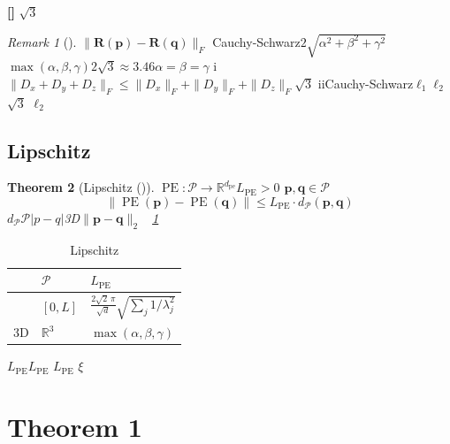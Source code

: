\documentclass[11pt,a4paper]{article}
\newtheorem{theorem}{Theorem}[section]
\theoremstyle{remark}
\newtheorem{remark}[theorem]{Remark}
\DeclareMathOperator{\PE}{PE}
\newcommand{\R}{\mathbb{R}}
\newcommand{\Ppos}{\mathcal{P}}
\newcommand{\pe}{\mathrm{pe}}
\newcommand{\rigorous}{\textnormal{\textbf{[]}}}
\begin{document}
\rigorous{} \textbf{}
$\sqrt{3}$

\begin{remark}[]
\label{rem:1.3.1}
$\|\mathbf{R}(\mathbf{p}) - \mathbf{R}(\mathbf{q})\|_F$
Cauchy-Schwarz$2\sqrt{\alpha^2 + \beta^2 + \gamma^2}$
$\max(\alpha, \beta, \gamma)$$2\sqrt{3} \approx 3.46$$\alpha=\beta=\gamma$
i$\|D_x+D_y+D_z\|_F
\leq \|D_x\|_F + \|D_y\|_F + \|D_z\|_F$$\sqrt{3}$
iiCauchy-Schwarz$\ell_1$$\ell_2$$\sqrt{3}$
$\ell_2$
\end{remark}

\subsection{Lipschitz}

\begin{theorem}[Lipschitz ()]
\label{thm:1.4.1}
$\PE: \Ppos \to \R^{d_{\pe}}$$L_{\PE} > 0$
$\mathbf{p}, \mathbf{q} \in \Ppos$
\begin{equation}
    \boxed{
    \|\PE(\mathbf{p}) - \PE(\mathbf{q})\| \leq L_{\PE} \cdot d_{\Ppos}(\mathbf{p}, \mathbf{q})
    }
\end{equation}
$d_{\Ppos}$$\Ppos$$|p-q|$3D$\|\mathbf{p} - \mathbf{q}\|_2$
~\ref{tab:lipschitz}
\end{theorem}

\begin{table}[htbp]
\centering
\caption{Lipschitz}
\label{tab:lipschitz}
\begin{tabular}{@{}lll@{}}
\toprule
\textbf{} & $\Ppos$ & $L_{\PE}$ \\
\midrule
 & $[0, L]$ & $\frac{2\sqrt{2}\,\pi}{\sqrt{d}}\sqrt{\sum_j 1/\lambda_j^2}$ \\
3D & $\R^3$ & $\max(\alpha, \beta, \gamma)$ \\
\bottomrule
\end{tabular}
\end{table}

\textbf{}$L_{\PE}$\textbf{}$L_{\PE}$
$L_{\PE}$
$\xi$

\section{Theorem 1}

\end{document}
